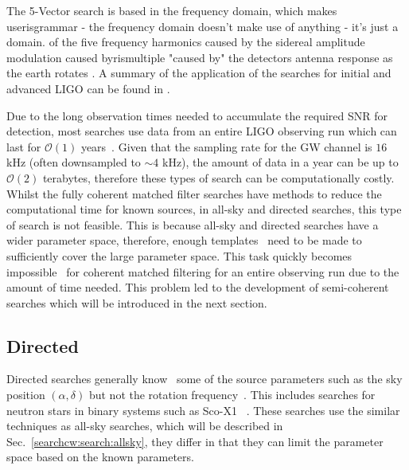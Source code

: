 The 5-Vector search is based in the frequency domain, which makes
useris{grammar - the frequency domain doesn't make use of anything - it's just
a domain.} of the five frequency harmonics caused by the sidereal amplitude
modulation caused byris{multiple "caused by"} the detectors antenna response as
the earth rotates \citep{astone2010MethodDetection,aasi2014GRAVITATIONALWAVES}.
A summary of the application of the searches for initial and advanced
\gls{LIGO} can be found in
\citep{aasi2014GRAVITATIONALWAVES,abbott2019SearchesGravitationala}.

Due to the long observation times needed to accumulate the required \gls{SNR}
for detection, most searches use data from an entire \gls{LIGO} observing run
which can last for $\mathcal{O}(1)$ years~.  Given
that the sampling rate for the \gls{GW} channel is $16$ kHz (often downsampled
to $\sim 4$ kHz), the amount of data in a year can be up to $\mathcal{O}(2)$
terabytes, therefore these types of search can be computationally costly.
Whilst the fully coherent matched filter searches have methods to reduce the
computational time for known sources, in all-sky and directed searches, this
type of search is not feasible.  This is because all-sky and directed searches
have a wider parameter space, therefore, enough templates~ need to be made to
sufficiently cover the large parameter space.  This task quickly becomes
impossible~ for coherent matched filtering
for an entire observing run due to the amount of time needed. This problem led
to the development of semi-coherent searches which will be introduced in the
next section. 

\subsection{\label{searchcw:search:directed}Directed}

Directed searches generally know~ some of the source parameters such as the sky position
$(\alpha,\delta)$ but not the rotation frequency~. This includes searches for neutron stars in
binary systems such as Sco-X1
\citep{abbott2017UpperLimits,meadors2016TuningScorpius}~.  These searches use
the similar techniques as all-sky searches, which will be described in
Sec.~\ref{searchcw:search:allsky}, they differ in that they can limit the
parameter space based on the known parameters.

